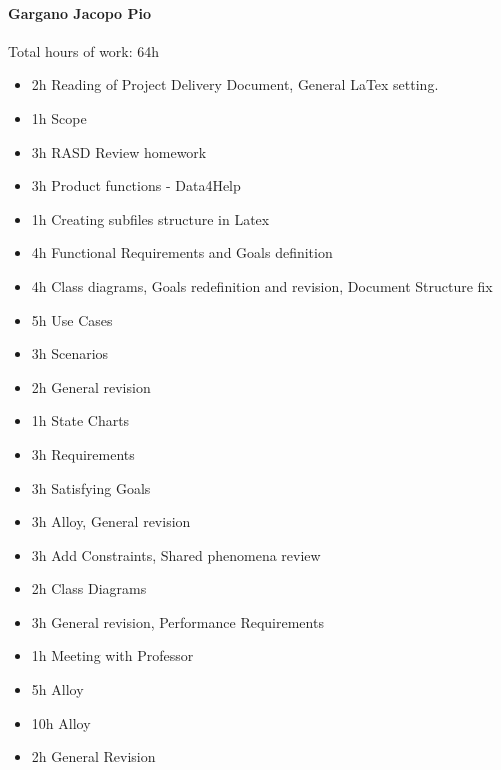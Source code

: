 \documentclass{report}
\begin{document}
		\paragraph{Gargano Jacopo Pio} Total hours of work: 64h
			\begin{itemize}
				\item 2h Reading of Project Delivery Document, General LaTex setting.
				\item 1h Scope
				\item 3h RASD Review homework
				\item 3h Product functions - Data4Help
				\item 1h Creating subfiles structure in Latex
				\item 4h Functional Requirements and Goals definition 
				\item 4h Class diagrams, Goals redefinition and revision, Document Structure fix
				\item 5h Use Cases
				\item 3h Scenarios
				\item 2h General revision
				\item 1h State Charts
				\item 3h Requirements
				\item 3h Satisfying Goals
				\item 3h Alloy, General revision
				\item 3h Add Constraints, Shared phenomena review
				\item 2h Class Diagrams
				\item 3h General revision, Performance Requirements
				\item 1h Meeting with Professor
				\item 5h Alloy
				\item 10h Alloy
				\item 2h General Revision

			\end{itemize}
\end{document}
